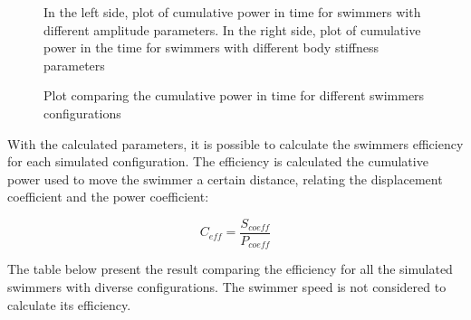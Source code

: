 \begin{figure}[H]
\centering
\begin{subfigure}
\centering
  \begin{footnotesize}
  
  \end{footnotesize}
\end{subfigure}
\begin{subfigure}%
\centering
  \begin{footnotesize}
  
     \end{footnotesize}
\end{subfigure}
\label{fig:Bild4.33}
  \caption[In the left side, plot of cumulative power in time for swimmers with different amplitude parameters. In the right side, plot of cumulative power in the time for swimmers with different body stiffness parameters]{In the left side, plot of cumulative power in time for swimmers with different amplitude parameters. In the right side, plot of cumulative power in the time for swimmers with different body stiffness parameters}
\end{figure}



\begin{figure}[H]
\centering
  \begin{footnotesize}
  
  \caption[Plot comparing the cumulative power in time for different swimmers configurations]{Plot comparing the cumulative power in time for different swimmers configurations}
   \label{fig:Bild4.xxx}
  \end{footnotesize}
\end{figure}

With the calculated parameters, it is possible to calculate the swimmers efficiency for each simulated configuration. The efficiency is calculated the cumulative power used to move
the swimmer a certain distance, relating the displacement coefficient and the power coefficient:

\begin{equation} 
  C_{eff} = \frac{S_{coeff}}{P_{coeff}}
\end{equation}

The table below present the result comparing the efficiency for all the simulated swimmers with diverse configurations. The swimmer speed is not considered to calculate its efficiency.


